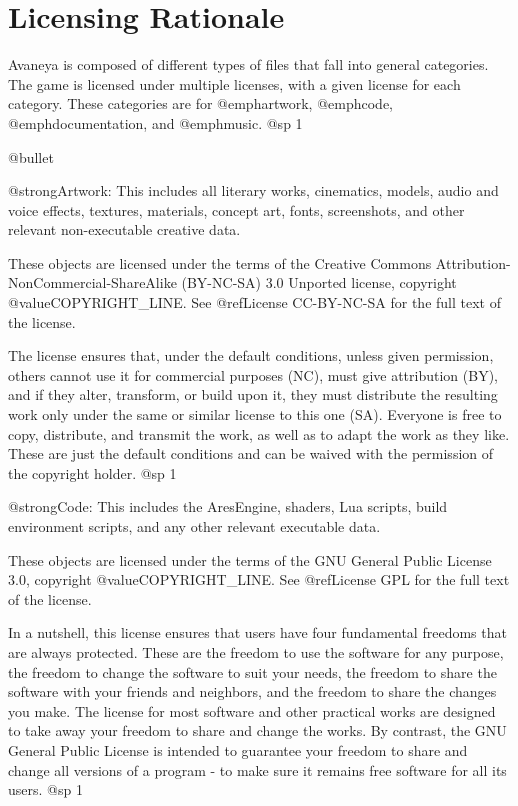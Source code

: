 \chapter{Licensing Rationale}

Avaneya is composed of different types of files that fall into general categories. The game is licensed under multiple licenses, with a given license for each category. These categories are for @emph{artwork}, @emph{code}, @emph{documentation}, and @emph{music}.
@sp 1

\itemize @bullet
\item
@strong{Artwork:} This includes all literary works, cinematics, models, audio and voice effects, textures, materials, concept art, fonts, screenshots, and other relevant non-executable creative data. 

These objects are licensed under the terms of the Creative Commons Attribution-NonCommercial-ShareAlike (BY-NC-SA) 3.0 Unported license, copyright @value{COPYRIGHT_LINE}. See @ref{License CC-BY-NC-SA} for the full text of the license.

The license ensures that, under the default conditions, unless given permission, others cannot use it for commercial purposes (NC), must give attribution (BY), and if they alter, transform, or build upon it, they must distribute the resulting work only under the same or similar license to this one (SA). Everyone is free to copy, distribute, and transmit the work, as well as to adapt the work as they like. These are just the default conditions and can be waived with the permission of the copyright holder.
@sp 1

\item
@strong{Code:} This includes the AresEngine, shaders, Lua scripts, build environment scripts, and any other relevant executable data.

These objects are licensed under the terms of the GNU General Public License 3.0, copyright @value{COPYRIGHT_LINE}. See @ref{License GPL} for the full text of the license.

In a nutshell, this license ensures that users have four fundamental freedoms that are always protected. These are the freedom to use the software for any purpose, the freedom to change the software to suit your needs, the freedom to share the software with your friends and neighbors, and the freedom to share the changes you make. The license for most software and other practical works are designed to take away your freedom to share and change the works. By contrast, the GNU General Public License is intended to guarantee your freedom to share and change all versions of a program - to make sure it remains free software for all its users.
@sp 1

